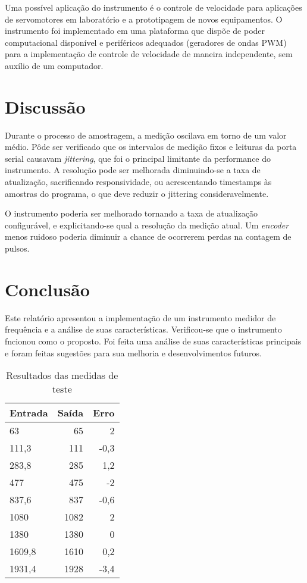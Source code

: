\documentclass[a4paper,9pt,twocolumn]{article}
\begin{document}
Uma possível aplicação do instrumento é o controle de velocidade para aplicações de servomotores em laboratório e a prototipagem de novos equipamentos. O instrumento foi implementado em uma plataforma que dispõe de poder computacional disponível e periféricos adequados (geradores de ondas PWM) para a implementação de controle de velocidade de maneira independente, sem auxílio de um computador. 

\section{Discussão}

Durante o processo de amostragem, a medição oscilava em torno de um valor médio. Pôde ser verificado que os intervalos de medição fixos e leituras da porta serial causavam \textit{jittering}, que foi o principal limitante da performance do instrumento. A resolução pode ser melhorada diminuindo-se a taxa de atualização, sacrificando responsividade, ou acrescentando timestamps às amostras do programa, o que deve reduzir o jittering consideravelmente.

O instrumento poderia ser melhorado tornando a taxa de atualização configurável, e explicitando-se qual a resolução da medição atual. Um \textit{encoder} menos ruidoso poderia diminuir a chance de ocorrerem perdas na contagem de pulsos.


\section{Conclusão}

Este relatório apresentou a implementação de um instrumento medidor de frequência e a análise de suas características. Verificou-se que o
instrumento fncionou como o proposto. Foi feita uma análise de suas características principais e foram feitas sugestões para sua melhoria
e desenvolvimentos futuros.


\begin{table}
\begin{center}
 

  \begin{tabular}{lrr}
    Entrada & Saída & Erro \\ \hline
    63  &  65  &  2 \\
    111,3  &  111  &  -0,3 \\
    283,8 & 285  &  1,2 \\
    477 & 475 &  -2 \\
    837,6 & 837 &  -0,6 \\
    1080 & 1082 &  2 \\
    1380 & 1380 & 0     \\
1609,8	& 1610	& 0,2     \\
1931,4	& 1928	& -3,4     
  \end{tabular}
  \caption{Resultados das medidas de teste}
  \label{tab:ch}

  \end{center}
\end{table}
\end{document}
